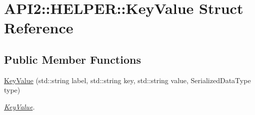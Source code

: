 \hypertarget{struct_a_p_i2_1_1_h_e_l_p_e_r_1_1_key_value}{\section{A\-P\-I2\-:\-:H\-E\-L\-P\-E\-R\-:\-:Key\-Value Struct Reference}
\label{struct_a_p_i2_1_1_h_e_l_p_e_r_1_1_key_value}
}
\subsection*{Public Member Functions}
\begin{DoxyCompactItemize}
\item 
\hyperlink{struct_a_p_i2_1_1_h_e_l_p_e_r_1_1_key_value_a3d25f585fa35e6aaf97841b025538276}{Key\-Value} (std\-::string label, std\-::string key, std\-::string value, Serialized\-Data\-Type type)
\begin{DoxyCompactList}\small\item\em \hyperlink{struct_a_p_i2_1_1_h_e_l_p_e_r_1_1_key_value}{Key\-Value}. \end{DoxyCompactList}\end{DoxyCompactItemize}
